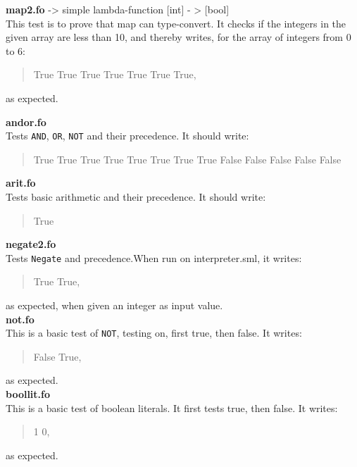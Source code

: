 \documentclass[11pt,a4paper]{article}
\theoremstyle{plain}
\theoremstyle{definition}
\theoremstyle{remark}
\numberwithin{equation}{section}
\begin{document}
	\textbf{map2.fo} -> simple lambda-function [int] - > [bool]\\
	This test is to prove that map can type-convert. It checks if the integers in the given array are less than 10, and thereby writes, for the array of integers from 0 to 6:
	\begin{quote}
		True True True True True True True,
	\end{quote}
	as expected.             
	
	\textbf{andor.fo}\\
	Tests \texttt{AND}, \texttt{OR}, \texttt{NOT} and their precedence. It should write:
	\begin{quote}
		True True True True True True True True False False False False False
	\end{quote}
	
	\textbf{arit.fo}\\
	Tests basic arithmetic and their precedence.
	It should write:
	\begin{quote}
		True
	\end{quote}
	
	\textbf{negate2.fo}\\
	Tests \texttt{Negate} and precedence.When run on interpreter.sml, it writes:
	\begin{quote}
		True True,
	\end{quote}
	as expected, when given an integer as input value.\\
	
	\textbf{not.fo}\\
	This is a basic test of \texttt{NOT}, testing on, first true, then false. It writes:             
	\begin{quote}
		False True,
	\end{quote}
	as expected.\\
	
	\textbf{boollit.fo}\\
	This is a basic test of boolean literals. It first tests true, then false. It writes:             
	\begin{quote}
		1 0,
	\end{quote}
	as expected.
	
	
\end{document}
